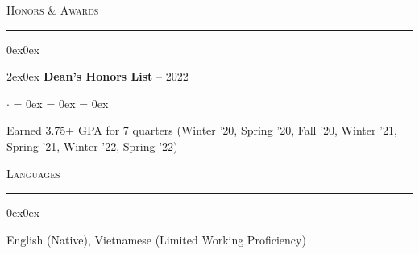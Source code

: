 \documentclass[10pt]{article}
\newcommand{\rSectionTitle}[1]{{\Large\scshape #1}}
\newcommand{\rEntryTitle}[1]{{\bfseries #1}}
\newcommand{\rEntryDate}[1]{{\mdseries #1}}
\newcommand{\rEntryCompany}[1]{{\itshape #1}}
\newcommand{\rEntryLocation}[1]{{\itshape #1}}
\newenvironment{rSection}[1]
{
    \rSectionTitle{#1}
    \vspace{0.75ex}
    \hrule
    \vspace{0.75ex}
    \begin{adjustwidth}{0ex}{0ex}
}
{
    \end{adjustwidth}
    \vspace{0.8ex}
}
\newenvironment{rEntryWithList}[4]
{
    \begin{adjustwidth}{2ex}{0ex}
    \rEntryTitle{#1} \hfill \rEntryDate{#2}
    \ifthenelse{\equal{#3}{}}{}{
        \\ \rEntryCompany{#3} \hfill \rEntryLocation{#4}
    }
    \vspace{0.25ex}
    \begin{list}{$\cdot$}{
        \leftmargin = 0ex
        \topsep = 0ex
        \itemsep = 0ex
    }
}
{
    \end{list}
    \end{adjustwidth}
    \vspace{0.5ex}
}
\begin{document}
\begin{rSection}{Honors \& Awards}
    \begin{rEntryWithList}
        {Dean's Honors List}
        {2020 -- 2022}
        {}
        {}
        \item Earned 3.75+ GPA for 7 quarters (Winter '20, Spring '20, Fall '20, Winter '21, Spring '21, Winter '22, Spring '22)
    \end{rEntryWithList}
\end{rSection}

\begin{rSection}{Languages}
    English (Native), Vietnamese (Limited Working Proficiency)
\end{rSection}
\end{document}
